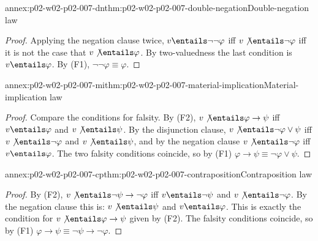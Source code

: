 \begin{annexitem}{annex:p02-w02-p02-007-dn}{thm:p02-w02-p02-007-double-negation}{Double-negation law}
\begin{proof}
Applying the negation clause twice, \(v\entails\neg\neg\varphi\) iff
\(v\not\entails\neg\varphi\) iff it is not the case that
\(v\not\entails\varphi\).  By two-valuedness the last condition is
\(v\entails\varphi\).  By (F1), \(\neg\neg\varphi\equiv\varphi\).
\end{proof}
\end{annexitem}

\begin{annexitem}{annex:p02-w02-p02-007-mi}{thm:p02-w02-p02-007-material-implication}{Material-implication law}
\begin{proof}
Compare the conditions for falsity.  By (F2),
\(v\not\entails\varphi\to\psi\) iff \(v\entails\varphi\) and
\(v\not\entails\psi\).  By the disjunction clause,
\(v\not\entails\neg\varphi\lor\psi\) iff \(v\not\entails\neg\varphi\) and
\(v\not\entails\psi\), and by the negation clause \(v\not\entails\neg\varphi\)
iff \(v\entails\varphi\).  The two falsity conditions coincide, so by (F1)
\(\varphi\to\psi\equiv\neg\varphi\lor\psi\).
\end{proof}
\end{annexitem}

\begin{annexitem}{annex:p02-w02-p02-007-cp}{thm:p02-w02-p02-007-contraposition}{Contraposition law}
\begin{proof}
By (F2), \(v\not\entails\neg\psi\to\neg\varphi\) iff
\(v\entails\neg\psi\) and \(v\not\entails\neg\varphi\).  By the negation
clause this is: \(v\not\entails\psi\) and \(v\entails\varphi\).  This is
exactly the condition for \(v\not\entails\varphi\to\psi\) given by (F2).  The
falsity conditions coincide, so by (F1)
\(\varphi\to\psi\equiv\neg\psi\to\neg\varphi\).
\end{proof}
\end{annexitem}

